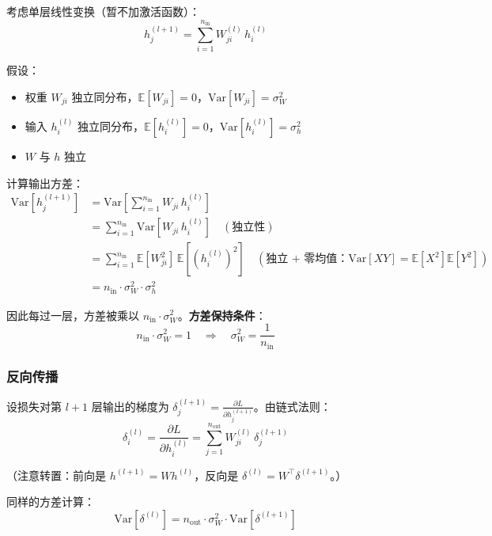 \documentclass[12pt, a4paper]{ctexart}
\begin{document}
考虑单层线性变换（暂不加激活函数）：
\begin{equation}
    h_j^{(l+1)} = \sum_{i=1}^{n_{\text{in}}} W_{ji}^{(l)}\, h_i^{(l)}
\end{equation}

假设：
\begin{itemize}
    \item 权重 $W_{ji}$ 独立同分布，$\mathbb{E}[W_{ji}] = 0$，$\text{Var}[W_{ji}] = \sigma_W^2$
    \item 输入 $h_i^{(l)}$ 独立同分布，$\mathbb{E}[h_i^{(l)}] = 0$，$\text{Var}[h_i^{(l)}] = \sigma_h^2$
    \item $W$ 与 $h$ 独立
\end{itemize}

计算输出方差：
\begin{align}
    \text{Var}[h_j^{(l+1)}] &= \text{Var}\left[\sum_{i=1}^{n_{\text{in}}} W_{ji}\, h_i^{(l)}\right] \\
    &= \sum_{i=1}^{n_{\text{in}}} \text{Var}[W_{ji}\, h_i^{(l)}] \quad (\text{独立性}) \\
    &= \sum_{i=1}^{n_{\text{in}}} \mathbb{E}[W_{ji}^2]\,\mathbb{E}[(h_i^{(l)})^2] \quad (\text{独立 + 零均值：} \text{Var}[XY] = \mathbb{E}[X^2]\mathbb{E}[Y^2]) \\
    &= n_{\text{in}} \cdot \sigma_W^2 \cdot \sigma_h^2
\end{align}

因此每过一层，方差被乘以 $n_{\text{in}} \cdot \sigma_W^2$。\textbf{方差保持条件}：
\begin{equation}
    n_{\text{in}} \cdot \sigma_W^2 = 1 \quad \Rightarrow \quad \sigma_W^2 = \frac{1}{n_{\text{in}}}
\end{equation}

\subsubsection{反向传播}

设损失对第 $l+1$ 层输出的梯度为 $\delta_j^{(l+1)} = \frac{\partial L}{\partial h_j^{(l+1)}}$。由链式法则：
\begin{equation}
    \delta_i^{(l)} = \frac{\partial L}{\partial h_i^{(l)}} = \sum_{j=1}^{n_{\text{out}}} W_{ji}^{(l)}\, \delta_j^{(l+1)}
\end{equation}

（注意转置：前向是 $h^{(l+1)} = W h^{(l)}$，反向是 $\delta^{(l)} = W^\top \delta^{(l+1)}$。）

同样的方差计算：
\begin{equation}
    \text{Var}[\delta^{(l)}] = n_{\text{out}} \cdot \sigma_W^2 \cdot \text{Var}[\delta^{(l+1)}]
\end{equation}
\end{document}
